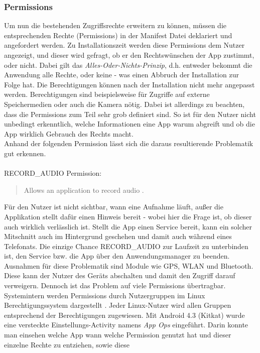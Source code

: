 	\subsubsection{Permissions}
	Um nun die bestehenden Zugriffsrechte erweitern zu können, müssen die
	entsprechenden Rechte (Permissions) in der Manifest Datei deklariert und
	angefordert werden. Zu Installationszeit werden diese Permissions dem Nutzer
	angezeigt, und dieser wird gefragt, ob er den Rechtswünschen der App zustimmt,
	oder nicht. Dabei gilt das \textit{Alles-Oder-Nichts-Prinzip}, d.h. entweder
	bekommt die Anwendung alle Rechte, oder keine - was einen Abbruch der
	Installation zur Folge hat. Die Berechtigungen können nach der Installation nicht mehr
	angepasst werden. Berechtigungen sind beispielsweise für Zugriffe auf externe
	Speichermedien oder auch die Kamera nötig. Dabei ist allerdings zu beachten,
	dass die Permissions zum Teil sehr grob definiert sind. So ist für den Nutzer
	nicht unbedingt erkenntlich, welche Informationen eine App warum abgreift und
	ob die App wirklich Gebrauch des Rechts macht.\\
	Anhand der folgenden Permission lässt sich die daraus resultierende Problematik
	gut erkennen.\\\\
	RECORD\_AUDIO Permission:
	\begin{quote}
		Allows an application to record audio \cite{RECORD_AUDIO}.
	\end{quote} 
	Für den Nutzer ist nicht sichtbar, wann eine Aufnahme läuft, außer die
	Applikation stellt dafür einen Hinweis bereit - wobei hier die Frage ist, ob
	dieser auch wirklich verlässlich ist. Stellt die App einen Service bereit,
	kann ein solcher Mitschnitt auch im Hintergrund geschehen und damit auch
	während eines Telefonats. Die einzige Chance RECORD\_AUDIO zur Laufzeit zu
	unterbinden ist, den Service bzw. die App über den Anwendungsmanager zu
	beenden. Ausnahmen für diese Problematik sind Module wie GPS, WLAN und
	Bluetooth. Diese kann der Nutzer des Geräts abschalten und damit den Zugriff
	darauf verweigern.
	Dennoch ist das Problem auf viele Permissions übertragbar.\\
	Systemintern werden Permissions durch Nutzergruppen im Linux
	Berechtigungssystem dargestellt \cite[S. 28]{Drake2014}. Jeder Linux-Nutzer
	wird allen Gruppen entsprechend der Berechtigungen zugewiesen.
	Mit Android 4.3 (Kitkat) wurde eine versteckte Einstellungs-Activity namens
	\textit{App Ops} eingeführt. Darin konnte man einsehen welche App wann welche
	Permission genutzt hat und dieser einzelne Rechte zu entziehen, sowie diese
